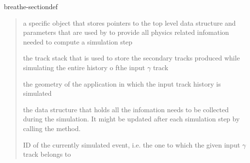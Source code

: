\documentclass[letterpaper,10pt,english]{sphinxmanual}
\begin{document}
\begin{fulllineitems}
\begin{sphinxuseclass}{breathe-sectiondef}
\begin{fulllineitems}
\begin{quote}
\begin{description}
\sphinxAtStartPar
a  specific object that stores pointers to the top level  data structure and parameters that are used by  to provide all physics related infomation needed to compute a simulation step 

\sphinxAtStartPar
the track stack that is used to store the secondary tracks produced while simulating the entire history o fthe input \(\gamma\) track 

\sphinxAtStartPar
the geometry of the application in which the input track history is simulated 

\sphinxAtStartPar
the data structure that holds all the infomation needs to be collected during the simulation. It might be updated after each simulation step by calling the  method. 

\sphinxAtStartPar
ID of the currently simulated event, i.e. the one to which the given input \(\gamma\) track belongs to 

\end{description}\end{quote}


\end{fulllineitems}



\end{sphinxuseclass}
\end{fulllineitems}
\end{document}
